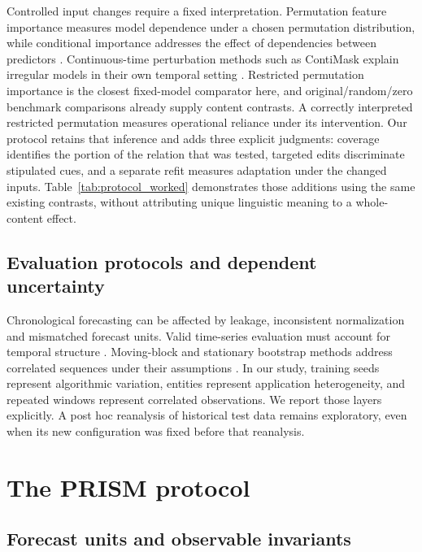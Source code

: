 \documentclass[preprint,11pt]{elsarticle}
\begin{document}
Controlled input changes require a fixed interpretation. Permutation feature importance measures model dependence under a chosen permutation distribution, while conditional importance addresses the effect of dependencies between predictors \cite{fisher2019allmodels,strobl2008conditional}. Continuous-time perturbation methods such as ContiMask explain irregular models in their own temporal setting \cite{moebus2025contimask}. Restricted permutation importance is the closest fixed-model comparator here, and original/random/zero benchmark comparisons already supply content contrasts. A correctly interpreted restricted permutation measures operational reliance under its intervention. Our protocol retains that inference and adds three explicit judgments: coverage identifies the portion of the relation that was tested, targeted edits discriminate stipulated cues, and a separate refit measures adaptation under the changed inputs. Table~\ref{tab:protocol_worked} demonstrates those additions using the same existing contrasts, without attributing unique linguistic meaning to a whole-content effect.

\subsection{Evaluation protocols and dependent uncertainty}

Chronological forecasting can be affected by leakage, inconsistent normalization and mismatched forecast units. Valid time-series evaluation must account for temporal structure \cite{bergmeir2018cv}. Moving-block and stationary bootstrap methods address correlated sequences under their assumptions \cite{kunsch1989block,politis1994stationary}. In our study, training seeds represent algorithmic variation, entities represent application heterogeneity, and repeated windows represent correlated observations. We report those layers explicitly. A post hoc reanalysis of historical test data remains exploratory, even when its new configuration was fixed before that reanalysis.

\section{The PRISM protocol}
\label{sec:protocol}

\subsection{Forecast units and observable invariants}
\end{document}
